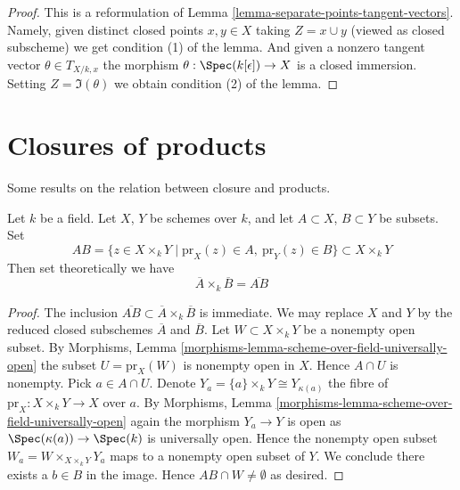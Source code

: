 \begin{proof}
This is a reformulation of
Lemma \ref{lemma-separate-points-tangent-vectors}.
Namely, given distinct closed points
$x, y \in X$ taking $Z = x \cup y$ (viewed as closed
subscheme) we get condition (1) of the lemma.
And given a nonzero tangent vector $\theta \in T_{X/k, x}$
the morphism $\theta : \Spec(k[\epsilon]) \to X$
is a closed immersion. Setting $Z = \Im(\theta)$
we obtain condition (2) of the lemma.
\end{proof}









\section{Closures of products}
\label{section-closure-of-products}

\noindent
Some results on the relation between closure and products.

\begin{lemma}
\label{lemma-closure-of-product}
Let $k$ be a field.
Let $X$, $Y$ be schemes over $k$, and let
$A \subset X$, $B \subset Y$ be subsets.
Set
$$
AB =
\{z \in X \times_k Y \mid \text{pr}_X(z) \in A, \ \text{pr}_Y(z) \in B\}
\subset X \times_k Y
$$
Then set theoretically we have
$$
\overline{A} \times_k \overline{B} = \overline{AB}
$$
\end{lemma}

\begin{proof}
The inclusion $\overline{AB} \subset \overline{A} \times_k \overline{B}$
is immediate.
We may replace $X$ and $Y$ by the reduced closed subschemes $\overline{A}$
and $\overline{B}$.
Let $W \subset X \times_k Y$ be a nonempty open subset. By
Morphisms, Lemma \ref{morphisms-lemma-scheme-over-field-universally-open}
the subset $U = \text{pr}_X(W)$ is nonempty open in $X$.
Hence $A \cap U$ is nonempty. Pick $a \in A \cap U$.
Denote $Y_a = \{a\} \times_k Y \cong Y_{\kappa(a)}$
the fibre of $\text{pr}_X : X \times_k Y \to X$ over $a$. By
Morphisms, Lemma \ref{morphisms-lemma-scheme-over-field-universally-open}
again the morphism $Y_a \to Y$ is open as
$\Spec(\kappa(a)) \to \Spec(k)$ is universally open.
Hence the nonempty open
subset $W_a = W \times_{X \times_k Y} Y_a$
maps to a nonempty open subset of $Y$.
We conclude there exists a $b \in B$ in the image.
Hence $AB \cap W \not = \emptyset$ as desired.
\end{proof}

